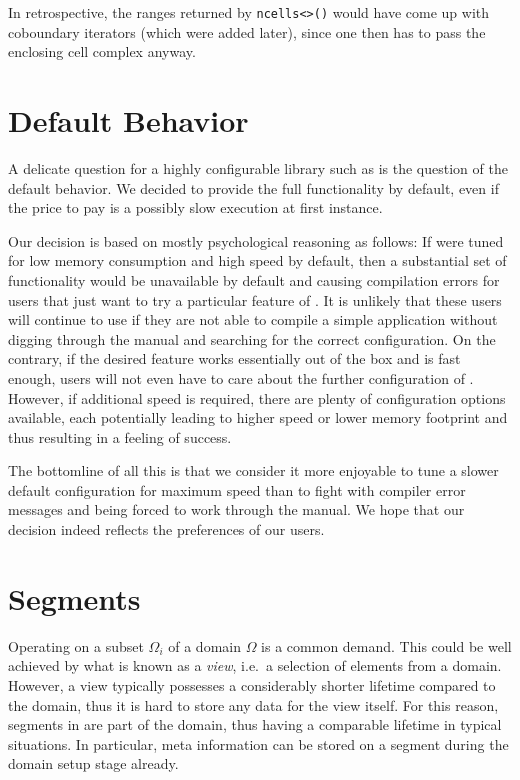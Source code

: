  In retrospective, the ranges returned by \lstinline|ncells<>()| would have come up with coboundary iterators (which were added later), since one then has to pass the enclosing cell complex anyway.

 \section{Default Behavior}
 A delicate question for a highly configurable library such as {\ViennaGrid} is the question of the default behavior. 
 We decided to provide the full functionality by default, even if the price to pay is a possibly slow execution at first instance.

 Our decision is based on mostly psychological reasoning as follows: If {\ViennaGrid} were tuned for low memory consumption and high speed by default, then a substantial set of functionality would be unavailable by default and causing compilation errors for users that just want to try a particular feature of {\ViennaGrid}. 
 It is unlikely that these users will continue to use {\ViennaGrid} if they are not able to compile a simple application without digging through the manual and searching for the correct configuration. On the contrary, if the desired feature works essentially out of the box and is fast enough, users will not even have to care about the further configuration of {\ViennaGrid}. However, if additional speed is required, there are plenty of configuration options available, each potentially leading to higher speed or lower memory footprint and thus resulting in a feeling of success. 

 The bottomline of all this is that we consider it more enjoyable to tune a slower default configuration for maximum speed than to fight with compiler error messages and being forced to work through the manual. We hope that our decision indeed reflects the preferences of our users.


 \section{Segments}
 Operating on a subset $\Omega_i$ of a domain $\Omega$ is a common demand. This could be well achieved by what is known as a \emph{view}, i.e.~a selection of elements from a domain. However, a view typically possesses a considerably shorter lifetime compared to the domain, thus it is hard to store any data for the view itself.
 For this reason, segments in {\ViennaGrid} are part of the domain, thus having a comparable lifetime in typical situations.
 In particular, meta information can be stored on a segment during the domain setup stage already.

